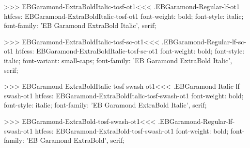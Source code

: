 {{{{{{{>>>
\<EBGaramond-ExtraBoldItalic-tosf-ot1\><<<
.EBGaramond-Regular-lf-ot1
htfcss:  EBGaramond-ExtraBoldItalic-tosf-ot1  font-weight: bold; font-style: italic; font-family: 'EB Garamond ExtraBold Italic', serif;

>>>
\<EBGaramond-ExtraBoldItalic-tosf-sc-ot1\><<<
.EBGaramond-Regular-lf-sc-ot1
htfcss:  EBGaramond-ExtraBoldItalic-tosf-sc-ot1  font-weight: bold; font-style: italic; font-variant: small-caps; font-family: 'EB Garamond ExtraBold Italic', serif;

>>>
\<EBGaramond-ExtraBoldItalic-tosf-swash-ot1\><<<
.EBGaramond-Italic-lf-swash-ot1
htfcss:  EBGaramond-ExtraBoldItalic-tosf-swash-ot1  font-weight: bold; font-style: italic; font-family: 'EB Garamond ExtraBold Italic', serif;

>>>
\<EBGaramond-ExtraBold-tosf-swash-ot1\><<<
.EBGaramond-Regular-lf-swash-ot1
htfcss:  EBGaramond-ExtraBold-tosf-swash-ot1  font-weight: bold; font-family: 'EB Garamond ExtraBold', serif;

}}}}}}}
